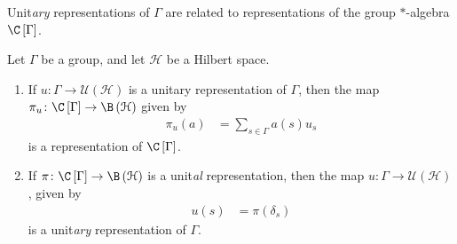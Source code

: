 \documentclass[10pt]{mypackage}
\begin{document}
Unit\textit{ary} representations of $\Gamma$ are related to representations of the group $\ast$-algebra $\C\left[\Gamma\right]$.
\begin{proposition}
  Let $\Gamma$ be a group, and let $\mathcal{H}$ be a Hilbert space.
  \begin{enumerate}[(1)]
    \item If $u\colon \Gamma\rightarrow \mathcal{U}\left(\mathcal{H}\right)$ is a unitary representation of $\Gamma$, then the map $\pi_u\colon \C\left[\Gamma\right]\rightarrow \B\left(\mathcal{H}\right)$ given by
      \begin{align*}
        \pi_u\left(a\right) &= \sum_{s\in \Gamma}a(s)u_s
      \end{align*}
      is a representation of $\C\left[\Gamma\right]$.
    \item If $\pi\colon \C\left[\Gamma\right] \rightarrow \B\left(\mathcal{H}\right)$ is a unit\textit{al} representation, then the map $u\colon \Gamma\rightarrow \mathcal{U}\left(\mathcal{H}\right)$, given by
      \begin{align*}
        u(s) &= \pi\left(\delta_s\right)
      \end{align*}
      is a unit\textit{ary} representation of $\Gamma$.
  \end{enumerate}
\end{proposition}
\end{document}
